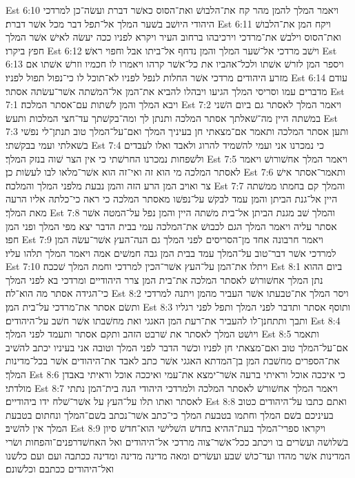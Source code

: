 Est 6:10  ויאמר המלך להמן מהר קח את־הלבושׁ ואת־הסוס כאשׁר דברת ועשׂה־כן למרדכי היהודי היושׁב בשׁער המלך אל־תפל דבר מכל אשׁר דברת׃
Est 6:11  ויקח המן את־הלבושׁ ואת־הסוס וילבשׁ את־מרדכי וירכיבהו ברחוב העיר ויקרא לפניו ככה יעשׂה לאישׁ אשׁר המלך חפץ ביקרו׃
Est 6:12  וישׁב מרדכי אל־שׁער המלך והמן נדחף אל־ביתו אבל וחפוי ראשׁ׃
Est 6:13  ויספר המן לזרשׁ אשׁתו ולכל־אהביו את כל־אשׁר קרהו ויאמרו לו חכמיו וזרשׁ אשׁתו אם מזרע היהודים מרדכי אשׁר החלות לנפל לפניו לא־תוכל לו כי־נפול תפול לפניו׃
Est 6:14  עודם מדברים עמו וסריסי המלך הגיעו ויבהלו להביא את־המן אל־המשׁתה אשׁר־עשׂתה אסתר׃
Est 7:1  ויבא המלך והמן לשׁתות עם־אסתר המלכה׃
Est 7:2  ויאמר המלך לאסתר גם ביום השׁני במשׁתה היין מה־שׁאלתך אסתר המלכה ותנתן לך ומה־בקשׁתך עד־חצי המלכות ותעשׂ׃
Est 7:3  ותען אסתר המלכה ותאמר אם־מצאתי חן בעיניך המלך ואם־על־המלך טוב תנתן־לי נפשׁי בשׁאלתי ועמי בבקשׁתי׃
Est 7:4  כי נמכרנו אני ועמי להשׁמיד להרוג ולאבד ואלו לעבדים ולשׁפחות נמכרנו החרשׁתי כי אין הצר שׁוה בנזק המלך׃
Est 7:5  ויאמר המלך אחשׁורושׁ ויאמר לאסתר המלכה מי הוא זה ואי־זה הוא אשׁר־מלאו לבו לעשׂות כן׃
Est 7:6  ותאמר־אסתר אישׁ צר ואויב המן הרע הזה והמן נבעת מלפני המלך והמלכה׃
Est 7:7  והמלך קם בחמתו ממשׁתה היין אל־גנת הביתן והמן עמד לבקשׁ על־נפשׁו מאסתר המלכה כי ראה כי־כלתה אליו הרעה מאת המלך׃
Est 7:8  והמלך שׁב מגנת הביתן אל־בית משׁתה היין והמן נפל על־המטה אשׁר אסתר עליה ויאמר המלך הגם לכבושׁ את־המלכה עמי בבית הדבר יצא מפי המלך ופני המן חפו׃
Est 7:9  ויאמר חרבונה אחד מן־הסריסים לפני המלך גם הנה־העץ אשׁר־עשׂה המן למרדכי אשׁר דבר־טוב על־המלך עמד בבית המן גבה חמשׁים אמה ויאמר המלך תלהו עליו׃
Est 7:10  ויתלו את־המן על־העץ אשׁר־הכין למרדכי וחמת המלך שׁככה׃
Est 8:1  ביום ההוא נתן המלך אחשׁורושׁ לאסתר המלכה את־בית המן צרר היהודיים ומרדכי בא לפני המלך כי־הגידה אסתר מה הוא־לה׃
Est 8:2  ויסר המלך את־טבעתו אשׁר העביר מהמן ויתנה למרדכי ותשׂם אסתר את־מרדכי על־בית המן׃
Est 8:3  ותוסף אסתר ותדבר לפני המלך ותפל לפני רגליו ותבך ותתחנן־לו להעביר את־רעת המן האגגי ואת מחשׁבתו אשׁר חשׁב על־היהודים׃
Est 8:4  ויושׁט המלך לאסתר את שׁרבט הזהב ותקם אסתר ותעמד לפני המלך׃
Est 8:5  ותאמר אם־על־המלך טוב ואם־מצאתי חן לפניו וכשׁר הדבר לפני המלך וטובה אני בעיניו יכתב להשׁיב את־הספרים מחשׁבת המן בן־המדתא האגגי אשׁר כתב לאבד את־היהודים אשׁר בכל־מדינות המלך׃
Est 8:6  כי איככה אוכל וראיתי ברעה אשׁר־ימצא את־עמי ואיככה אוכל וראיתי באבדן מולדתי׃
Est 8:7  ויאמר המלך אחשׁורשׁ לאסתר המלכה ולמרדכי היהודי הנה בית־המן נתתי לאסתר ואתו תלו על־העץ על אשׁר־שׁלח ידו ביהודיים׃
Est 8:8  ואתם כתבו על־היהודים כטוב בעיניכם בשׁם המלך וחתמו בטבעת המלך כי־כתב אשׁר־נכתב בשׁם־המלך ונחתום בטבעת המלך אין להשׁיב׃
Est 8:9  ויקראו ספרי־המלך בעת־ההיא בחדשׁ השׁלישׁי הוא־חדשׁ סיון בשׁלושׁה ועשׂרים בו ויכתב ככל־אשׁר־צוה מרדכי אל־היהודים ואל האחשׁדרפנים־והפחות ושׂרי המדינות אשׁר מהדו ועד־כושׁ שׁבע ועשׂרים ומאה מדינה מדינה ומדינה ככתבה ועם ועם כלשׁנו ואל־היהודים ככתבם וכלשׁונם׃

